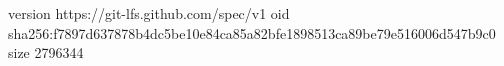 version https://git-lfs.github.com/spec/v1
oid sha256:f7897d637878b4dc5be10e84ca85a82bfe1898513ca89be79e516006d547b9c0
size 2796344
